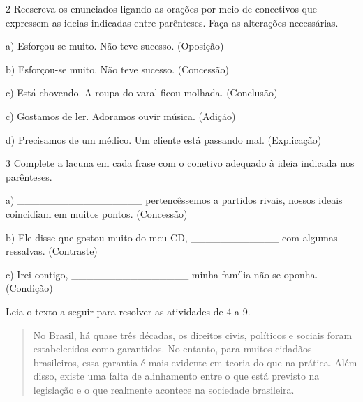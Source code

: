 \num{2} Reescreva os enunciados ligando as orações por meio de
conectivos que expressem as ideias indicadas entre parênteses. Faça as
alterações necessárias.

a) Esforçou-se muito. Não teve sucesso. (Oposição)


b) Esforçou-se muito. Não teve sucesso. (Concessão)


c) Está chovendo. A roupa do varal ficou molhada. (Conclusão)


c) Gostamos de ler. Adoramos ouvir música. (Adição)


d) Precisamos de um médico. Um cliente está passando mal. (Explicação)


\num{3} Complete a lacuna em cada frase com o conetivo adequado à ideia
indicada nos parênteses.

a) \_\_\_\_\_\_\_\_\_\_\_\_\_\_\_\_\_ pertencêssemos a
partidos rivais, nossos ideais coincidiam em muitos pontos. (Concessão)

b) Ele disse que gostou muito do meu CD,
\_\_\_\_\_\_\_\_\_\_\_\_ com algumas ressalvas. (Contraste)

c) Irei contigo, \_\_\_\_\_\_\_\_\_\_\_\_\_\_\_\_ minha
família não se oponha. (Condição)

Leia o texto a seguir para resolver as atividades de 4 a 9.

\begin{quote}
No Brasil, há quase três décadas, os direitos civis, políticos e sociais
foram estabelecidos como garantidos. No entanto, para muitos cidadãos
brasileiros, essa garantia é mais evidente em teoria do que na prática.
Além disso, existe uma falta de alinhamento entre o que está previsto na
legislação e o que realmente acontece na sociedade brasileira.
\end{quote}

